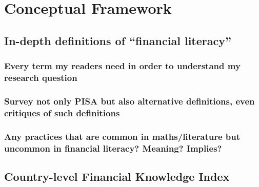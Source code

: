 \documentclass[a4paper,11pt,UKenglish,twoside,openright]{report}\usepackage[]{graphicx}\usepackage[]{color}
\begin{document}

\chapter{Conceptual Framework}
\label{chp:2}

\section{In-depth definitions of ``financial literacy''}

\subsection{Every term my readers need in order to understand my research question}

\subsection{Survey not only PISA but also alternative definitions, even critiques of such definitions}

\subsection{Any practices that are common in maths/literature but uncommon in financial literacy? Meaning? Implies?}

\newpage

\section{Country-level Financial Knowledge Index}
\end{document}

